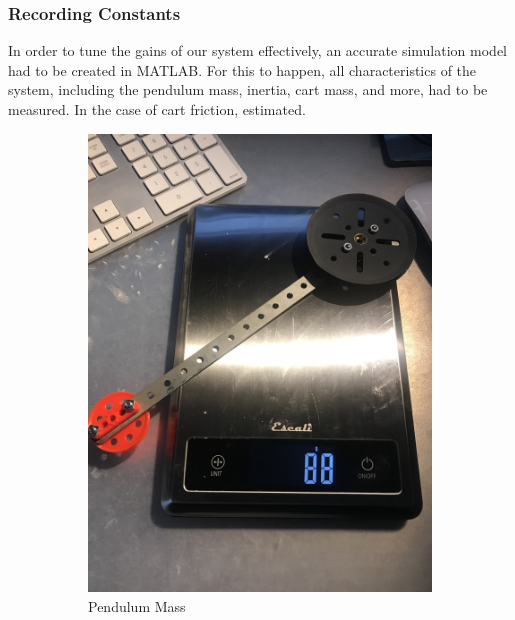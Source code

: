 \documentclass[12pt]{article}
\begin{document}
\subsubsection{Recording Constants}
\label{record}
In order to tune the gains of our system effectively, an accurate simulation model had to be created in MATLAB. For this to happen, all characteristics of the system, including the pendulum mass, inertia, cart mass, and more, had to be measured. In the case of cart friction, estimated.
\begin{figure}[H]
    \centering
    \begin{subfigure}{.49\textwidth}
      \centering
      \includegraphics[width=1\linewidth]{figures/weigh1.jpg}
      \caption{Pendulum Mass}
      \label{fig:pMass}
    \end{subfigure}
    \begin{subfigure}{.49\textwidth}
      \centering

\end{subfigure}
\end{figure}
\end{document}
